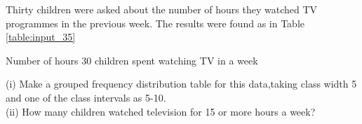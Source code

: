 Thirty children were asked about the number of hours they watched TV programmes in the previous week. The results were found as in Table \ref{table:input_35}

\begin{table}[ht!]
\centering

\caption{Number of hours 30 children spent watching TV in a week}
\label{table:input_35}
\end{table}
(i) Make a grouped frequency distribution table for this data,taking class width 5 and one of the class intervals as 5-10.\\
(ii)  How many children watched television for 15 or more hours a week?\\
